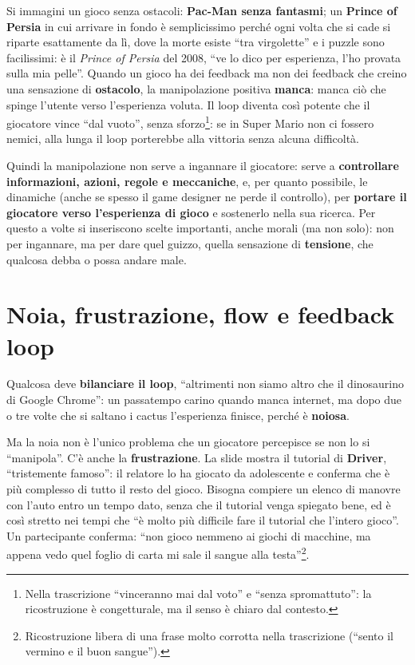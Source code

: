 Si immagini un gioco senza ostacoli: \textbf{Pac-Man senza fantasmi}; un
\textbf{Prince of Persia} in cui arrivare in fondo è semplicissimo perché ogni
volta che si cade si riparte esattamente da lì, dove la morte esiste ``tra
virgolette'' e i puzzle sono facilissimi: è il \emph{Prince of Persia} del
2008, ``ve lo dico per esperienza, l'ho provata sulla mia pelle''. Quando un
gioco ha dei feedback ma non dei feedback che creino una sensazione di
\textbf{ostacolo}, la manipolazione positiva \textbf{manca}: manca ciò che
spinge l'utente verso l'esperienza voluta. Il loop diventa così potente che il
giocatore vince ``dal vuoto'', senza sforzo\footnote{Nella trascrizione
``vinceranno mai dal voto'' e ``senza spromattuto'': la ricostruzione è
congetturale, ma il senso è chiaro dal contesto.}: se in Super Mario non ci
fossero nemici, alla lunga il loop porterebbe alla vittoria senza alcuna
difficoltà.

Quindi la manipolazione non serve a ingannare il giocatore: serve a
\textbf{controllare informazioni, azioni, regole e meccaniche}, e, per quanto
possibile, le dinamiche (anche se spesso il game designer ne perde il
controllo), per \textbf{portare il giocatore verso l'esperienza di gioco} e
sostenerlo nella sua ricerca. Per questo a volte si inseriscono scelte
importanti, anche morali (ma non solo): non per ingannare, ma per dare quel
guizzo, quella sensazione di \textbf{tensione}, che qualcosa debba o possa andare
male.

\section{Noia, frustrazione, flow e feedback loop}
\label{sec:z6-loop}

Qualcosa deve \textbf{bilanciare il loop}, ``altrimenti non siamo altro che il
dinosaurino di Google Chrome'': un passatempo carino quando manca internet, ma
dopo due o tre volte che si saltano i cactus l'esperienza finisce, perché è
\textbf{noiosa}.

Ma la noia non è l'unico problema che un giocatore percepisce se non lo si
``manipola''. C'è anche la \textbf{frustrazione}. La slide mostra il tutorial di
\textbf{Driver}, ``tristemente famoso'': il relatore lo ha giocato da
adolescente e conferma che è più complesso di tutto il resto del gioco. Bisogna
compiere un elenco di manovre con l'auto entro un tempo dato, senza che il
tutorial venga spiegato bene, ed è così stretto nei tempi che ``è molto più
difficile fare il tutorial che l'intero gioco''. Un partecipante conferma:
``non gioco nemmeno ai giochi di macchine, ma appena vedo quel foglio di carta mi
sale il sangue alla testa''\footnote{Ricostruzione libera di una frase molto
corrotta nella trascrizione (``sento il vermino e il buon sangue'').}.

